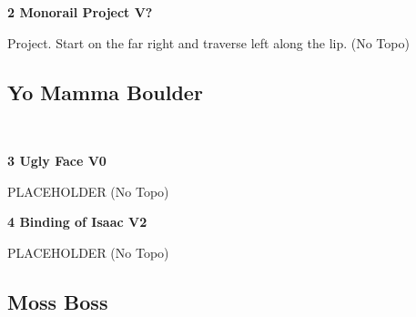 \begin{multicols}{2}
\begin{minipage}{\columnwidth}
			\end{minipage}
			
					\begin{minipage}{\linewidth}	
					\label{rt:Monorail Project}
\colorbox{black!20}{
\parbox{0.95\textwidth}{
\textbf{
2 Monorail Project V?  
}
}
}

					\begin{adjustwidth}{0.5cm}{}				
					Project. Start on the far right and traverse left along the lip.
						\newline (No Topo) 
					\end{adjustwidth}
					\end{minipage}
			\begin{minipage}{\columnwidth}
			\subsection*{Yo Mamma Boulder}\label{bf:Yo Mamma Boulder}
			\
			
			\end{minipage}
			
					\begin{minipage}{\linewidth}	
					\label{rt:Ugly Face}
\colorbox{green!20}{
\parbox{0.95\textwidth}{
\textbf{
3 Ugly Face V0   \warn 
}
}
}

					\begin{adjustwidth}{0.5cm}{}				
					PLACEHOLDER
						\newline (No Topo) 
					\end{adjustwidth}
					\end{minipage}
					\begin{minipage}{\linewidth}	
					\label{rt:Binding of Isaac}
\colorbox{green!20}{
\parbox{0.95\textwidth}{
\textbf{
4 Binding of Isaac V2    \warn 
}
}
}

					\begin{adjustwidth}{0.5cm}{}				
					PLACEHOLDER
						\newline (No Topo) 
					\end{adjustwidth}
					\end{minipage}
			\begin{minipage}{\columnwidth}
			\subsection*{Moss Boss}\label{bf:Moss Boss}
			\
			
			\end{minipage}
			

\end{multicols}
